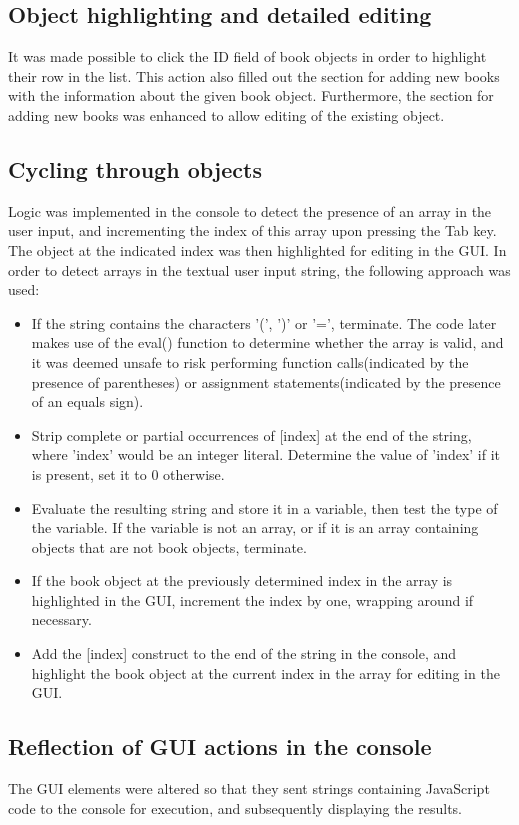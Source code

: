 \subsection{Object highlighting and detailed editing}
It was made possible to click the ID field of book objects in order to highlight their row in the list. This action also filled out the section for adding new books with the information about the given book object. Furthermore, the section for adding new books was enhanced to allow editing of the existing object.

\subsection{Cycling through objects}
Logic was implemented in the console to detect the presence of an array in the user input, and incrementing the index of this array upon pressing the Tab key. The object at the indicated index was then highlighted for editing in the GUI. In order to detect arrays in the textual user input string, the following approach was used:
\begin{itemize}
\item If the string contains the characters '(', ')' or '=', terminate. The code later makes use of the eval() function to determine whether the array is valid, and it was deemed unsafe to risk performing function calls(indicated by the presence of parentheses) or assignment statements(indicated by the presence of an equals sign).
\item Strip complete or partial occurrences of [index] at the end of the string, where 'index' would be an integer literal. Determine the value of 'index' if it is present, set it to 0 otherwise.
\item Evaluate the resulting string and store it in a variable, then test the type of the variable. If the variable is not an array, or if it is an array containing objects that are not book objects, terminate.
\item If the book object at the previously determined index in the array is highlighted in the GUI, increment the index by one, wrapping around if necessary.
\item Add the [index] construct to the end of the string in the console, and highlight the book object at the current index in the array for editing in the GUI.
\end{itemize}

\subsection{Reflection of GUI actions in the console}
The GUI elements were altered so that they sent strings containing JavaScript code to the console for execution, and subsequently displaying the results. 

